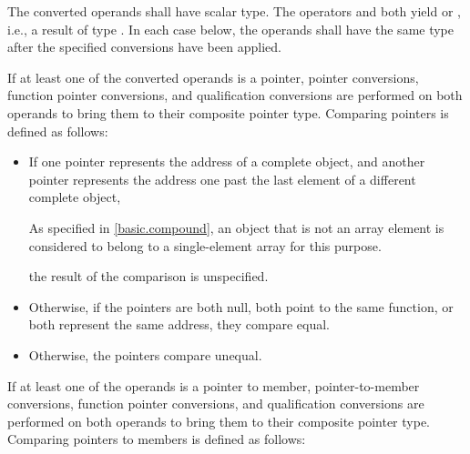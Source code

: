 \pnum
The converted operands shall have scalar type. The operators
\tcode{==} and \tcode{!=} both yield  or , i.e., a
result of type . In each case below, the operands shall have the
same type after the specified conversions have been applied.

\pnum
{}%
%
If at least one of the converted operands is a pointer,
pointer conversions,
function pointer conversions, and
qualification conversions
are performed on both operands to bring them to their composite pointer type.
Comparing pointers is defined as follows:

\begin{itemize}
\item
If one pointer represents the address of a complete object, and another
pointer represents the address one past the last element of a different
complete object,
\begin{footnote}
As specified in \ref{basic.compound},
an object that is not an array element is
considered to belong to a single-element array for this purpose.
\end{footnote}
the result of the comparison is unspecified.
\item
Otherwise, if the pointers are both null, both point to the same
%
function, or both represent the same address,
they compare equal.
\item
Otherwise, the pointers compare unequal.
\end{itemize}

\pnum
If at least one of the operands is a pointer to member,
pointer-to-member conversions,
function pointer conversions, and
qualification conversions
are performed on both operands to bring them to
their composite pointer type.
Comparing pointers to members is defined as follows:

